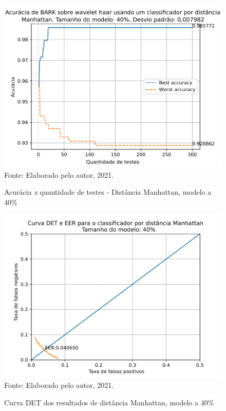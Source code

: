 			\begin{figure}[H]
				\centering
				\caption{Acurácia \textit{x} quantidade de testes - Distância Manhattan, modelo a 40\%}
				\includegraphics[width=.9\linewidth]{images/results/confusionMatrices/classifier_Manhattan_40}
				\label{fig:classifiermanhattan40}
				\\Fonte: Elaborado pelo autor, 2021.
			\end{figure}
		
			\begin{figure}[H]
				\centering
				\caption{Curva DET dos resultados de distância Manhattan, modelo a 40\%}
				\includegraphics[width=.9\linewidth]{images/results/det/DET_for_classifier_Manhattan_40}
				\label{fig:detforclassifiermanhattan40}
				\\Fonte: Elaborado pelo autor, 2021.
			\end{figure}
			
